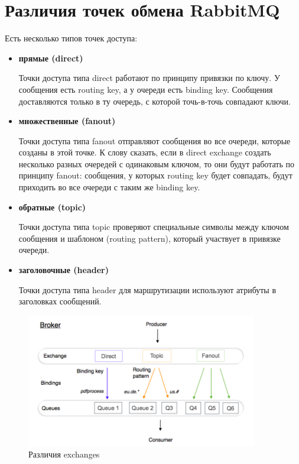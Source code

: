 \section{Различия точек обмена RabbitMQ}

Есть несколько типов точек доступа:

\begin{itemize}
\item \textbf{прямые (direct)}

Точки доступа типа direct работают по принципу привязки по ключу. У сообщения есть routing key, а у очереди есть binding key. Сообщения доставляются только в ту очередь, с которой точь-в-точь совпадают ключи.
\item \textbf{множественные (fanout)}

Точки доступа типа fanout отправляют сообщения во все очереди, которые созданы в этой точке. К слову сказать, если в direct exchange создать несколько разных очередей с одинаковым ключом, то они будут работать по принципу fanout: сообщения, у которых routing key будет совпадать, будут приходить во все очереди с таким же binding key.
\item \textbf{обратные (topic)}

Точки доступа типа topic проверяют специальные символы между ключом сообщения и шаблоном (routing pattern), который участвует в привязке очереди.
\item \textbf{заголовочные (header)}

Точки доступа типа header для маршрутизации используют атрибуты в заголовках сообщений.
\end{itemize}

\begin{figure}[h!]
\centering
\includegraphics[width=0.9\textwidth]{exchanges}
\caption{Различия exchanges}
\label{fig6}
\end{figure}

